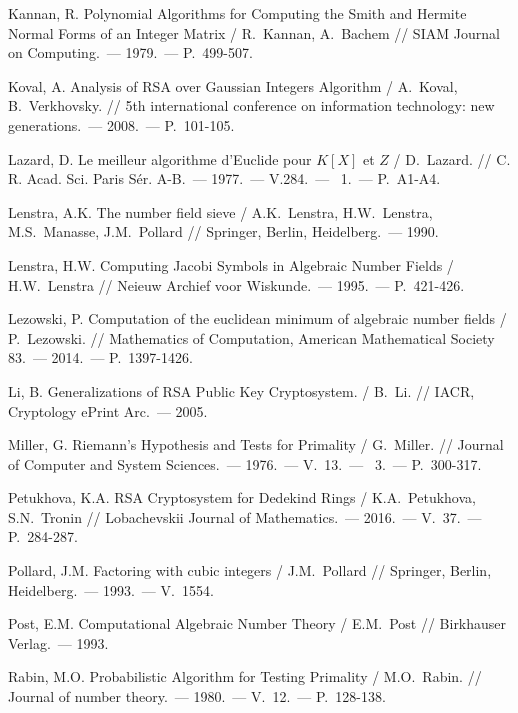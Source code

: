 \begin{thebibliography}{99}
    Kannan, R. Polynomial Algorithms for Computing the Smith and Hermite Normal Forms of an Integer Matrix / R.~Kannan, A.~Bachem // SIAM Journal on Computing.~--- 1979.~--- P.~499-507.

    Koval, A. Analysis of RSA over Gaussian Integers Algorithm / A.~Koval, B.~Verkhovsky. // 5th international conference on information technology: new generations.~--- 2008.~--- P.~101-105.
    
    Lazard, D. Le meilleur algorithme d'{E}uclide pour {$K[X]$} et {$Z$} / D.~Lazard. // C. R. Acad. Sci. Paris S\'er. A-B.~--- 1977.~--- V.284.~--- \textnumero~1.~--- P.~A1-A4.
    
    Lenstra, A.K. The number field sieve / A.K.~Lenstra, H.W.~Lenstra, M.S.~Manasse, J.M.~Pollard // Springer, Berlin, Heidelberg.~--- 1990.

    Lenstra, H.W. Computing Jacobi Symbols in Algebraic Number Fields / H.W.~Lenstra // Neieuw Archief voor Wiskunde.~--- 1995.~--- P.~421-426.

    Lezowski, P. Computation of the euclidean minimum of algebraic number fields / P.~Lezowski. // Mathematics of Computation, American Mathematical Society 83.~--- 2014.~--- P.~1397-1426.

    Li, B. Generalizations of RSA Public Key Cryptosystem. / B.~Li. // IACR, Cryptology ePrint Arc.~--- 2005.

    Miller, G. Riemann's Hypothesis and Tests for Primality / G.~Miller. // Journal of Computer and System Sciences.~--- 1976.~--- V.~13.~--- ~3.~--- P.~300-317.
    
    Petukhova, K.A. RSA Cryptosystem for Dedekind Rings / K.A.~Petukhova, S.N.~Tronin // Lobachevskii Journal of Mathematics.~--- 2016.~--- V.~37.~--- P.~284-287.
    
    Pollard, J.M. Factoring with cubic integers / J.M.~Pollard // Springer, Berlin, Heidelberg.~--- 1993.~--- V.~1554.

    Post, E.M. Computational Algebraic Number Theory / E.M.~Post // Birkhauser Verlag.~--- 1993.

    Rabin, M.O. Probabilistic Algorithm for Testing Primality / M.O.~Rabin. // Journal of number theory.~--- 1980.~--- V.~12.~--- P.~128-138.
    

\end{thebibliography}
